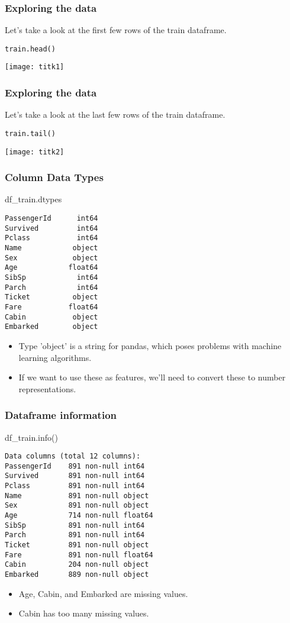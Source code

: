 \begin{frame}[fragile]\frametitle{Exploring  the data}
Let's take a look at the first few rows of the train dataframe.
\begin{lstlisting}
train.head()
\end{lstlisting}
\begin{center}
\texttt{[image: titk1]}
\end{center}
\end{frame}

\begin{frame}[fragile]\frametitle{Exploring  the data}
Let's take a look at the last few rows of the train dataframe.
\begin{lstlisting}
train.tail()
\end{lstlisting}
\begin{center}
\texttt{[image: titk2]}
\end{center}
\end{frame}

\begin{frame}[fragile]\frametitle{Column Data Types}
df\_train.dtypes
\begin{lstlisting}
PassengerId      int64
Survived         int64
Pclass           int64
Name            object
Sex             object
Age            float64
SibSp            int64
Parch            int64
Ticket          object
Fare           float64
Cabin           object
Embarked        object
\end{lstlisting}
\begin{itemize}
\item Type 'object' is a string for pandas, which poses problems with machine learning algorithms. 
\item If we want to use these as features, we'll need to convert these to number representations.
\end{itemize}
\end{frame}

\begin{frame}[fragile]\frametitle{Dataframe information}
df\_train.info()
\begin{lstlisting}
Data columns (total 12 columns):
PassengerId    891 non-null int64
Survived       891 non-null int64
Pclass         891 non-null int64
Name           891 non-null object
Sex            891 non-null object
Age            714 non-null float64
SibSp          891 non-null int64
Parch          891 non-null int64
Ticket         891 non-null object
Fare           891 non-null float64
Cabin          204 non-null object
Embarked       889 non-null object
\end{lstlisting}
\begin{itemize}
\item Age, Cabin, and Embarked are missing values. 
\item Cabin has too many missing values.
\end{itemize}
\end{frame}


